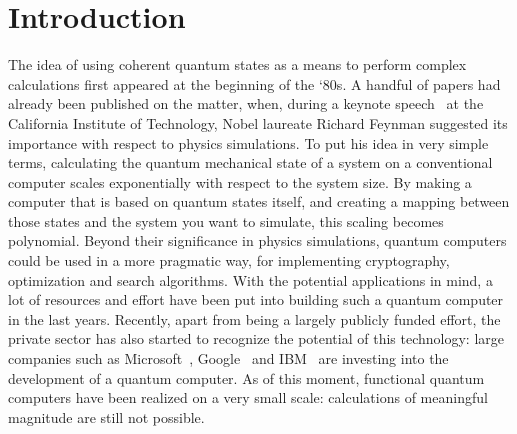 \chapter{Introduction}

	The idea of using coherent quantum states as a means to perform complex calculations first appeared at the beginning of the `80s.
	A handful of papers had already been published on the matter, when, during a keynote speech~\cite{feynman_simulating_1982} at the California Institute of Technology, Nobel laureate Richard Feynman suggested its importance with respect to physics simulations.
	To put his idea in very simple terms, calculating the quantum mechanical state of a system on a conventional computer scales exponentially with respect to the system size.
	By making a computer that is based on quantum states itself, and creating a mapping between those states and the system you want to simulate, this scaling becomes polynomial.
	Beyond their significance in physics simulations, quantum computers could be used in a more pragmatic way, for implementing cryptography, optimization and search algorithms.
	With the potential applications in mind, a lot of resources and effort have been put into building such a quantum computer in the last years.
	Recently, apart from being a largely publicly funded effort, the private sector has also started to recognize the potential of this technology: large companies such as Microsoft~\cite{noauthor_why_nodate}, Google~\cite{noauthor_quantum_nodate} and IBM~\cite{noauthor_ibm_2018} are investing into the development of a quantum computer.
	As of this moment, functional quantum computers have been realized on a very small scale: calculations of meaningful magnitude are still not possible.


